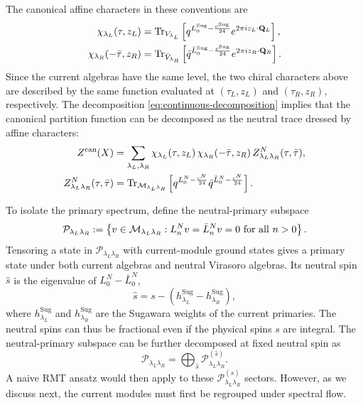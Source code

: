 \documentclass[11pt]{article}
\numberwithin{equation}{section}
\begin{document}
The canonical affine characters in these conventions are
\begin{equation}
\begin{aligned}
    \chi_{\lambda_L}(\tau,z_L)
    &=\operatorname{Tr}_{V_{\lambda_L}}\left[q^{L^{\mathrm{Sug}}_0-\frac{c^{\mathrm{Sug}}}{24}}
      e^{2\pi i z_L\cdot\mathbf Q_L}\right],\\
    \chi_{\lambda_R}(-\bar\tau,z_R)
    &=\operatorname{Tr}_{\bar V_{\lambda_R}}\left[\bar q^{\bar L^{\mathrm{Sug}}_0-\frac{c^{\mathrm{Sug}}}{24}}
      e^{2\pi i z_R\cdot\mathbf Q_R}\right].
\end{aligned}
\label{eq:character-general}
\end{equation}
Since the current algebras have the same level, the two chiral characters above are described by the same function evaluated at $(\tau_L,z_L)$ and $(\tau_R,z_R)$, respectively.
The decomposition \eqref{eq:continuous-decomposition} implies that the canonical partition function can be decomposed as the neutral trace dressed by affine characters:
\begin{equation}
\begin{aligned}
    Z^{\mathrm{can}}(X)
    &=\sum_{\lambda_L,\lambda_R}\chi_{\lambda_L}(\tau,z_L)\,
      \chi_{\lambda_R}(-\bar\tau,z_R)\,
      Z^N_{\lambda_L\lambda_R}(\tau,\bar\tau),\\
    Z^N_{\lambda_L\lambda_R}(\tau,\bar\tau)
    &=\operatorname{Tr}_{\mathcal{M}_{\lambda_L\lambda_R}}\left[
      q^{L^N_0-\frac{c^N}{24}}\bar q^{\bar L^N_0-\frac{c^N}{24}}\right].
\end{aligned}
\label{eq:dressed-Z-general}
\end{equation}

To isolate the primary spectrum, define the neutral-primary subspace
\begin{equation}
    \mathcal P_{\lambda_L\lambda_R}
    :=\left\{v\in\mathcal{M}_{\lambda_L\lambda_R}:
    L^N_n v=\bar L^N_n v=0\ \text{for all }n>0\right\}.
    \label{equ:neutral_primary_space}
\end{equation}
Tensoring a state in $\mathcal P_{\lambda_L\lambda_R}$ with current-module ground states gives a primary state  under both current algebras and neutral Virasoro algebras. Its neutral spin $\hat s$ is the eigenvalue of $L^N_0-\bar L^N_0$,
\begin{equation}
    \hat s=s-\left(h^{\mathrm{Sug}}_{\lambda_L}-h^{\mathrm{Sug}}_{\lambda_R}\right),
\end{equation}
where $h^{\mathrm{Sug}}_{\lambda_L}$ and $h^{\mathrm{Sug}}_{\lambda_R}$ are the Sugawara weights of the current primaries. The neutral spins can thus be fractional even if the physical spins $s$ are integral.  The neutral-primary subspace can be further decomposed at fixed neutral spin as
\begin{equation}
\mathcal P_{\lambda_L\lambda_R}
 =\bigoplus_{\hat s}\mathcal P^{(\hat s)}_{\lambda_L\lambda_R}.
\label{eq:neutral-spin-blocks}
\end{equation}
A naive RMT ansatz would then apply to these $\mathcal P^{(\hat s)}_{\lambda_L\lambda_R}$ sectors. However, as we discuss next, the current modules must first be regrouped under spectral flow.
\end{document}
